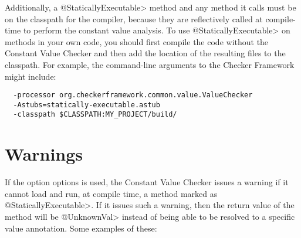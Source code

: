 Additionally, a \<@StaticallyExecutable> method and any method it calls must be on
the classpath for the compiler, because they are reflectively called at
compile-time to perform the constant value analysis.
To use \<@StaticallyExecutable> on methods in your own code, you should
first compile the code without the Constant Value Checker and then add
the location of the resulting  files to the
classpath. For example, the command-line arguments to the Checker Framework
might include:
\begin{Verbatim}
  -processor org.checkerframework.common.value.ValueChecker
  -Astubs=statically-executable.astub
  -classpath $CLASSPATH:MY_PROJECT/build/
\end{Verbatim}


\section{Warnings\label{value-checker-warnings}}

If the option  options is used, the Constant Value Checker issues a warning if it cannot load and run, at
compile time, a method marked as \<@StaticallyExecutable>.  If it issues
such a warning, then the return value of the method will be \<@UnknownVal>
instead of being able to be resolved to a specific value annotation.
Some examples of these:

